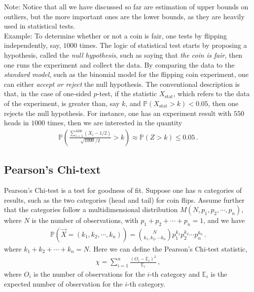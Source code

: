 \documentclass[11pt, onesided]{book}
\theoremstyle{break}
\theoremstyle{break}
\newcommand{\note}{\color{red}Note: \color{black}}
\newcommand{\example}{\color{green}Example: \color{black}}
\begin{document}
\note Notice that all we have discussed so far are estimation of upper bounds on outliers, but the more important ones are the lower bounds, as they are heavily used in statistical tests. \\


\example To determine whether or not a coin is fair, one tests by flipping independently, say, $1000$ times. The logic of statistical test starts by proposing a hypothesis, called the \textit{null hypothesis}, such as saying that \textit{the coin is fair}, then one runs the experiment and collect the data. By comparing the data to the \textit{standard model}, such as the binomial model for the flipping coin experiment, one can either \textit{accept or reject} the null hypothesis. The conventional description is that, in the case of one-sided $p$-test, if the statistic $X_{\text{stat}}$, which refers to the data of the experiment, is greater than, say $k$, and $\mathbb{P}(X_{\text{stat}} > k) < 0.05$, then one rejects the null hypothesis. For instance, one has an experiment result with $550$ heads in $1000$ times, then we are interested in the quantity
\begin{align*}
\mathbb{P}\left( \frac{\sum_{i=1}^{1000}(X_i - 1/2)}{\sqrt{1000}/2} > k\right) \approx \mathbb{P}(Z>k) \leq 0.05\,.
\end{align*}


\subsection{Pearson's Chi-text}
Pearson's Chi-test is a test for goodness of fit. Suppose one has $n$ categories of results, such as the two categories (head and tail) for coin flips. Assume further that the categories follow a multidimensional distribution $M(N, p_1,p_2,\cdots, p_n)$, where $N$ is the number of observations, with $p_1 + p_2 + \cdots + p_n = 1$, and we have 
\begin{align*}
\mathbb{P}(\vec{X} = (k_1,k_2,\cdots, k_n)) =\binom{N}{k_1,k_2,\cdots k_n}p_1^{k_1}p_2^{k_2}\cdots p_n^{k_n}\,.
\end{align*}
where $k_1 + k_2 + \cdots + k_n = N$. Here we can define the Pearson's Chi-test statistic,
\begin{align*}
\chi = \sum_{i=1}^n \frac{(O_i - \mathbb{E}_i)^2}{\mathbb{E}_i}\,,
\end{align*}
where $O_i$ is the number of observations for the $i$-th category and $\mathbb{E}_i$ is the expected number of observation for the $i$-th category. 
\end{document}
